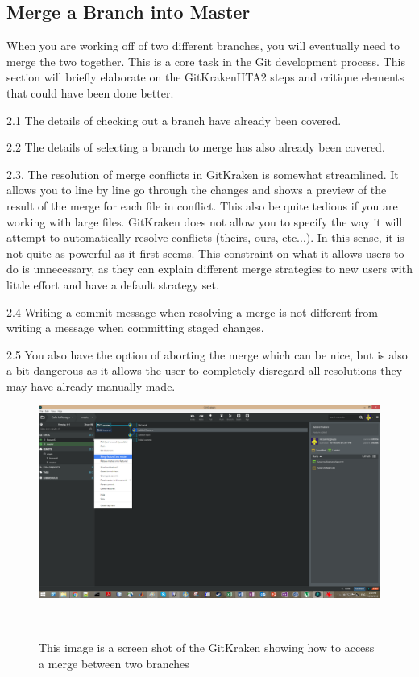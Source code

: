 \documentclass{sigchi}
\begin{document}
\subsection{Merge a Branch into Master}
When you are working off of two different branches, you will eventually need to merge the two together.
This is a core task in the Git development process. This section will briefly elaborate on the GitKrakenHTA2 steps and critique elements that could have been done better.

2.1 The details of checking out a branch have already been covered.

2.2 The details of selecting a branch to merge has also already been covered.

2.3. The resolution of merge conflicts in GitKraken is somewhat streamlined. It allows you to line by line go through the changes and shows a preview of the result of the merge for each file in conflict. This also be quite tedious if you are working with large files. GitKraken does not allow you to specify the way it will attempt to automatically resolve conflicts (theirs, ours, etc...). In this sense, it is not quite as powerful as it first seems. This constraint on what it allows users to do is unnecessary, as they can explain different merge strategies to new users with little effort and have a default strategy set.

2.4 Writing a commit message when resolving a merge is not different from writing a message when committing staged changes.

2.5 You also have the option of aborting the merge which can be nice, but is also a bit dangerous as it allows the user to completely disregard all resolutions they may have already manually made.

\begin{figure}
  \centering
  \includegraphics[width=1.75\columnwidth]{figures/GitKraken/MergeDropdown}
  \caption{This image is a screen shot of the GitKraken showing how to access a merge between two branches}~\label{fig:GitKrakenFigure4}
\end{figure}
\end{document}
